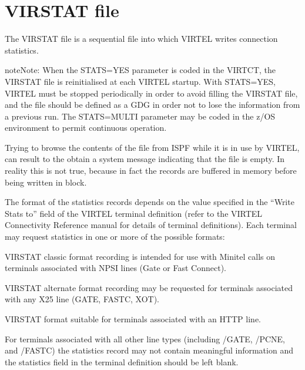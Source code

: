 \documentclass[letterpaper,10pt,english]{sphinxmanual}
\begin{document}
\section{VIRSTAT file}
\label{\detokenize{audit_operations_ and_performance:virstat-file}}\label{\detokenize{audit_operations_ and_performance:index-84}}
\sphinxAtStartPar
The VIRSTAT file is a sequential file into which VIRTEL writes connection statistics.

\begin{sphinxadmonition}{note}{Note:}
\sphinxAtStartPar
When the STATS=YES parameter is coded in the VIRTCT, the VIRSTAT file is reinitialised at each VIRTEL startup. With STATS=YES, VIRTEL must be stopped periodically in order to avoid filling the VIRSTAT
file, and the file should be defined as a GDG in order not to lose the information from a previous run. The STATS=MULTI parameter may be coded in the z/OS environment to permit continuous operation.

\sphinxAtStartPar
Trying to browse the contents of the file from ISPF while it is in use by VIRTEL, can result to the obtain a system message indicating that the file is empty. In reality this is not true, because in fact
the records are buffered in memory before being written in block.
\end{sphinxadmonition}

\sphinxAtStartPar
The format of the statistics records depends on the value specified in the “Write Stats to” field of the VIRTEL terminal definition (refer to the VIRTEL Connectivity Reference manual for details of terminal definitions). Each terminal may request statistics in one or more of the possible formats:
\begin{description}
\sphinxAtStartPar
VIRSTAT classic format recording is intended for use with Minitel calls on terminals associated with NPSI lines (Gate or Fast Connect).

\sphinxAtStartPar
VIRSTAT alternate format recording may be requested for terminals associated with any X25 line (GATE, FASTC, XOT).

\sphinxAtStartPar
VIRSTAT format suitable for terminals associated with an HTTP line.

\end{description}

\sphinxAtStartPar
For terminals associated with all other line types (including /GATE, /PCNE, and /FASTC) the statistics record may not contain meaningful information and the statistics field in the terminal definition     should be left blank.
\end{document}
